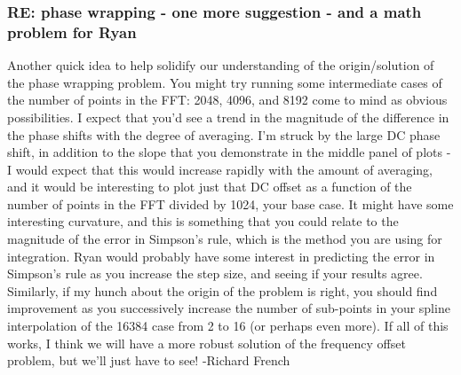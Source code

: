 \documentclass[crop=false,class=book]{standalone}
\begin{document}
\subsubsection{\footnotesize RE: phase wrapping - one more suggestion - and a math problem for Ryan}
Another quick idea to help solidify our understanding of the origin/solution of the phase wrapping problem. You might try running some intermediate cases of the number of points in the FFT: 2048, 4096, and 8192 come to mind as obvious possibilities. I expect that you'd see a trend in the magnitude of the difference in the phase shifts with the degree of averaging. I'm struck by the large DC phase shift, in addition to the slope that you demonstrate in the middle panel of plots - I would expect that this would increase rapidly with the amount of averaging, and it would be interesting to plot just that DC offset as a function of the number of points in the FFT divided by 1024, your base case. It might have some interesting curvature, and this is something that you could relate to the magnitude of the error in Simpson's rule, which is the method you are using for integration. Ryan would probably have some interest in predicting the error in Simpson's rule as you increase the step size, and seeing if your results agree. Similarly, if my hunch about the origin of the problem is right, you should find improvement as you successively increase the number of sub-points in your spline interpolation of the 16384 case from 2 to 16 (or perhaps even more). If all of this works, I think we will have a more robust solution of the frequency offset problem, but we'll just have to see! -Richard French
\end{document}
